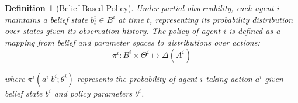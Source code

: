\documentclass[a4paper,12pt]{report}
\newtheorem{definition}{Definition}
\begin{document}
\begin{definition}[Belief-Based Policy]
    Under partial observability, each agent $i$ maintains a belief state $b_t^i \in B^i$ at time $t$, representing its probability distribution over states given its observation history. The policy of agent $i$ is defined as a mapping from belief and parameter spaces to distributions over actions:
    \begin{equation}
        \pi^i: B^i \times \Theta^i \mapsto \Delta(A^i)
    \end{equation}

    where $\pi^i(a^i|b^i; \theta^i)$ represents the probability of agent $i$ taking action $a^i$ given belief state $b^i$ and policy parameters $\theta^i$.
\end{definition}

\end{document}
